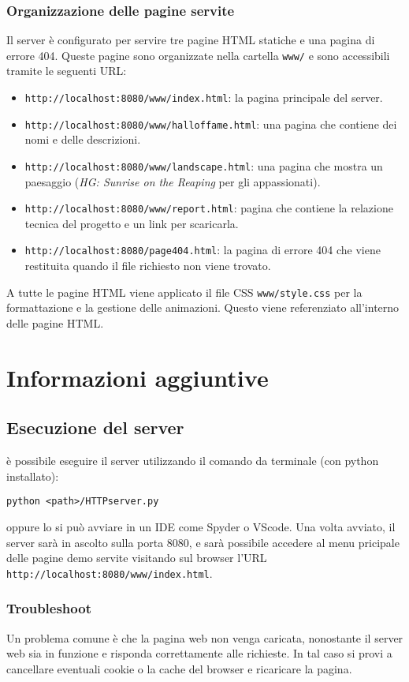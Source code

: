 \documentclass[a4paper,12pt]{report}
\begin{document}
\subsection{Organizzazione delle pagine servite}
\label{sec:organizzazione-pagine}
Il server è configurato per servire tre pagine HTML statiche e una pagina di errore 404. Queste pagine sono organizzate nella cartella \texttt{www/} e sono accessibili tramite le seguenti URL:
\begin{itemize}
    \item \texttt{http://localhost:8080/www/index.html}: la pagina principale del server.
    \item \texttt{http://localhost:8080/www/halloffame.html}: una pagina che contiene dei nomi e delle descrizioni.
    \item \texttt{http://localhost:8080/www/landscape.html}: una pagina che mostra un paesaggio (\textit{HG: Sunrise on the Reaping} per gli appassionati).
    \item \texttt{http://localhost:8080/www/report.html}: pagina che contiene la relazione tecnica del progetto e un link per scaricarla.
    \item \texttt{http://localhost:8080/page404.html}: la pagina di errore 404 che viene restituita quando il file richiesto non viene trovato.
\end{itemize}
A tutte le pagine HTML viene applicato il file CSS \texttt{www/style.css} per la formattazione e la gestione delle animazioni. Questo viene referenziato all'interno delle pagine HTML.


\chapter{Informazioni aggiuntive}
\label{sec:info_aggiuntive}

\section{Esecuzione del server}
è possibile eseguire il server utilizzando il comando da terminale (con python installato):
\begin{verbatim}
python <path>/HTTPserver.py
\end{verbatim}
oppure lo si può avviare in un IDE come Spyder o VScode.
Una volta avviato, il server sarà in ascolto sulla porta 8080, e sarà possibile accedere al menu pricipale delle pagine demo servite visitando sul browser l'URL \texttt{http://localhost:8080/www/index.html}.
\subsection{Troubleshoot}
Un problema comune è che la pagina web non venga caricata, nonostante il server web sia in funzione e risponda correttamente alle richieste. In tal caso si provi a cancellare eventuali cookie o la cache del browser e ricaricare la pagina.
\end{document}
